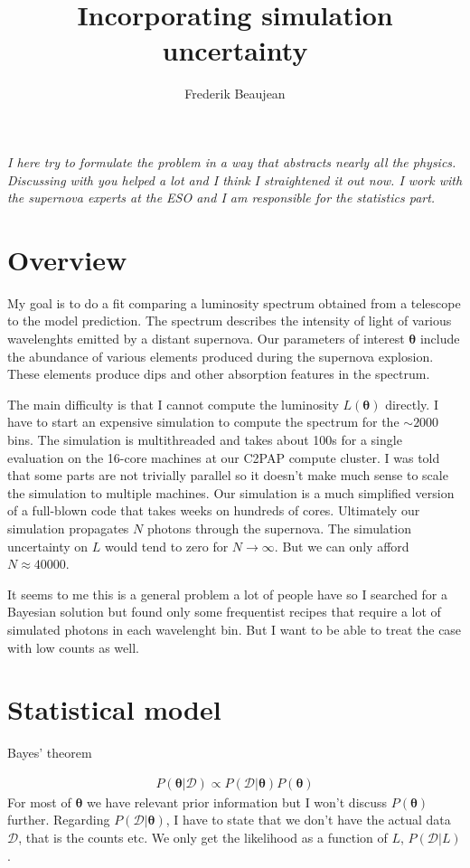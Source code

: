 \documentclass[a4,12pt]{article}
\title{Incorporating simulation uncertainty}
\author{Frederik Beaujean}
\newcommand{\data}{\ensuremath{\mathcal{D}}}
\newcommand{\given}[2]{\ensuremath{(#1 | #2)}}
\renewcommand{\vec}[1]{\boldsymbol{#1}}
\newcommand{\vecth}{\ensuremath{{\vec{\theta}}}}
\begin{document}
\maketitle

\noindent
\emph{I here try to formulate the problem in a way that abstracts
  nearly all the physics. Discussing with you helped a lot and I think
  I straightened it out now. I work with the supernova experts at the
  ESO and I am responsible for the statistics part.}

\section*{Overview}
My goal is to do a fit comparing a luminosity spectrum obtained from a
telescope to the model prediction. The spectrum describes the
intensity of light of various wavelenghts emitted by a distant
supernova. Our parameters of interest $\vecth$ include the abundance
of various elements produced during the supernova explosion. These
elements produce dips and other absorption features in the
spectrum.

The main difficulty is that I cannot compute the luminosity
$L(\vecth)$ directly. I have to start an expensive simulation to
compute the spectrum for the $\sim 2000$ bins. The simulation is
multithreaded and takes about 100s for a single evaluation on the
16-core machines at our C2PAP compute cluster. I was told that some
parts are not trivially parallel so it doesn't make much sense to
scale the simulation to multiple machines. Our simulation is a much
simplified version of a full-blown code that takes weeks on hundreds
of cores. Ultimately our simulation propagates $N$ photons through the
supernova. The simulation uncertainty on $L$ would tend to zero for $N
\to \infty$. But we can only afford $N \approx 40000$.

It seems to me this is a general problem a lot of people have so I
searched for a Bayesian solution but found only some frequentist
recipes that require a lot of simulated photons in each wavelenght
bin. But I want to be able to treat the case with low counts as well.

\section*{Statistical model}

Bayes' theorem

\begin{align}
  P\given{\vecth}{\data} \propto P\given{\data}{\vecth} P(\vecth)
\end{align}
For most of $\vecth$ we have relevant prior information but I won't
discuss $P(\vecth)$ further. Regarding $P\given{\data}{\vecth}$, I
have to state that we don't have the actual data $\data$, that is the
counts etc. We only get the likelihood as a function of $L$,
$P\given{\data}{L}$.
\end{document}
